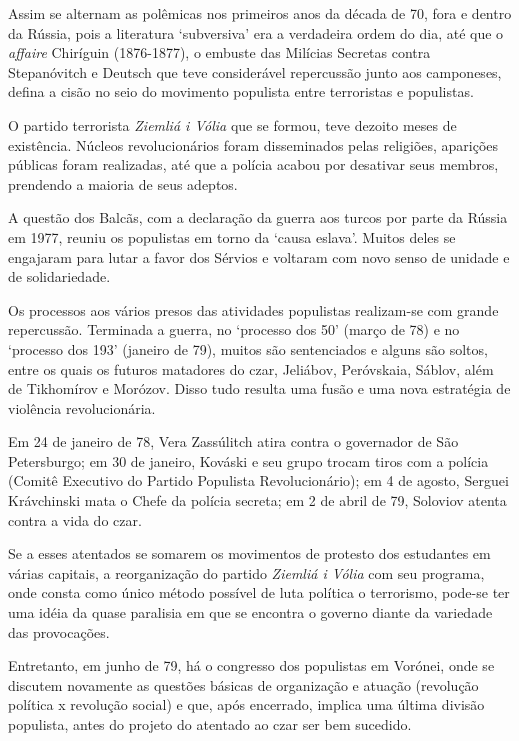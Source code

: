 Assim se alternam as polêmicas nos primeiros anos da década de 70, fora
e dentro da Rússia, pois a literatura `subversiva' era a verdadeira
ordem do dia, até que o \emph{affaire} Chiríguin (1876-1877), o embuste
das Milícias Secretas contra Stepanóvitch e Deutsch que teve
considerável repercussão junto aos camponeses, defina a cisão no seio do
movimento populista entre terroristas e populistas.

O partido terrorista \emph{Ziemliá i Vólia} que se formou, teve dezoito
meses de existência. Núcleos revolucionários foram disseminados pelas
religiões, aparições públicas foram realizadas, até que a polícia acabou
por desativar seus membros, prendendo a maioria de seus adeptos.

A questão dos Balcãs, com a declaração da guerra aos turcos por parte da
Rússia em 1977, reuniu os populistas em torno da `causa eslava'. Muitos
deles se engajaram para lutar a favor dos Sérvios e voltaram com novo
senso de unidade e de solidariedade.

Os processos aos vários presos das atividades populistas realizam-se com
grande repercussão. Terminada a guerra, no `processo dos 50' (março de
78) e no `processo dos 193' (janeiro de 79), muitos são sentenciados e
alguns são soltos, entre os quais os futuros matadores do czar,
Jeliábov, Peróvskaia, Sáblov, além de Tikhomírov e Morózov. Disso tudo
resulta uma fusão e uma nova estratégia de violência revolucionária.

Em 24 de janeiro de 78, Vera Zassúlitch atira contra o governador de São
Petersburgo; em 30 de janeiro, Kováski e seu grupo trocam tiros com a
polícia (Comitê Executivo do Partido Populista Revolucionário); em 4 de
agosto, Serguei Krávchinski mata o Chefe da polícia secreta; em 2 de
abril de 79, Soloviov atenta contra a vida do czar.

Se a esses atentados se somarem os movimentos de protesto dos estudantes
em várias capitais, a reorganização do partido \emph{Ziemliá i Vólia}
com seu programa, onde consta como único método possível de luta
política o terrorismo, pode-se ter uma idéia da quase paralisia em que
se encontra o governo diante da variedade das provocações.

Entretanto, em junho de 79, há o congresso dos populistas em Vorónei,
onde se discutem novamente as questões básicas de organização e atuação
(revolução política x revolução social) e que, após encerrado, implica
uma última divisão populista, antes do projeto do atentado ao czar ser
bem sucedido.

